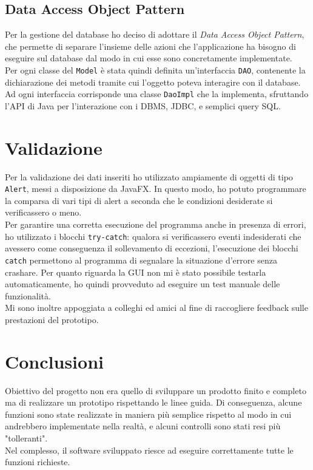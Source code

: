 \documentclass[12pt,a4paper]{article}
\begin{document}
	\subsection{Data Access Object Pattern}
	Per la gestione del database ho deciso di adottare il \textit{Data Access Object Pattern}, che permette di separare l'insieme delle azioni che l'applicazione ha bisogno di eseguire sul database dal modo in cui esse sono concretamente implementate.\\
	Per ogni classe del \texttt{Model} è stata quindi definita un'interfaccia \texttt{DAO}, contenente la dichiarazione dei metodi tramite cui l'oggetto poteva interagire con il database. Ad ogni interfaccia corrisponde una classe \texttt{DaoImpl} che la implementa, sfruttando l'API di Java per l'interazione con i DBMS, JDBC, e semplici query SQL.
	\section{Validazione}
	Per la validazione dei dati inseriti ho utilizzato ampiamente di oggetti di tipo \texttt{Alert}, messi a disposizione da JavaFX. In questo modo, ho potuto programmare la comparsa di vari tipi di alert a seconda che le condizioni desiderate si verificassero o meno.\\
	Per garantire una corretta esecuzione del programma anche in presenza di errori, ho utilizzato i blocchi \texttt{try-catch}: qualora si verificassero eventi indesiderati che avessero come conseguenza il sollevamento di eccezioni, l'esecuzione dei blocchi \texttt{catch} permettono al programma di segnalare la situazione d'errore senza crashare.
	Per quanto riguarda la GUI non mi è stato possibile testarla automaticamente, ho quindi provveduto ad eseguire un test manuale delle funzionalità.\\
	Mi sono inoltre appoggiata a colleghi ed amici al fine di raccogliere feedback sulle prestazioni del prototipo.
	\section{Conclusioni}
	Obiettivo del progetto non era quello di sviluppare un prodotto finito e completo ma di realizzare un prototipo rispettando le linee guida. Di conseguenza, alcune funzioni sono state realizzate in maniera più semplice rispetto al modo in cui andrebbero implementate nella realtà, e alcuni controlli sono stati resi più "tolleranti".\\Nel complesso, il software sviluppato riesce ad eseguire correttamente tutte le funzioni richieste.
\end{document}

